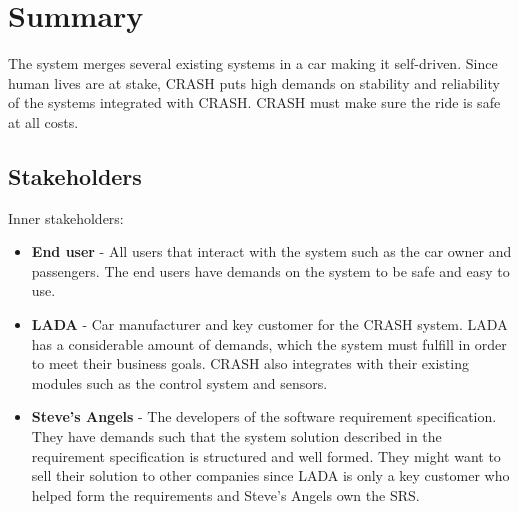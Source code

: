 \documentclass{article}
\begin{document}
\section{Summary}
The system merges several existing systems in a car making it self-driven. Since human lives are at stake, CRASH puts high demands on stability and reliability of the systems integrated with CRASH. CRASH must make sure the ride is safe at all costs.

\subsection{Stakeholders}
\noindent Inner stakeholders:
\begin{itemize}
\item \textbf{End user} - All users that interact with the system such as the car owner and passengers. The end users have demands on the system to be safe and easy to use.
\item \textbf{LADA} - Car manufacturer and key customer for the CRASH system. LADA has a considerable amount of demands, which the system must fulfill in order to meet their business goals. CRASH also integrates with their existing modules such as the control system and sensors.
\item \textbf{Steve's Angels} - The developers of the software requirement specification. They have demands such that the system solution described in the requirement specification is structured and well formed. They might want to sell their solution to other companies since LADA is only a key customer who helped form the requirements and Steve's Angels own the SRS.
\end{itemize}
\end{document}
